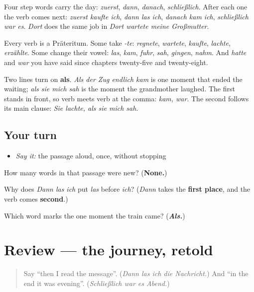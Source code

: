 \begin{culture}
Four step words carry the day: \emph{zuerst}, \emph{dann}, \emph{danach}, \emph{schließlich}. After each one the verb comes next: \emph{zuerst kaufte ich}, \emph{dann las ich}, \emph{danach kam ich}, \emph{schließlich war es}. \emph{Dort} does the same job in \emph{Dort wartete meine Großmutter}.

Every verb is a Präteritum. Some take \emph{-te}: \emph{regnete}, \emph{wartete}, \emph{kaufte}, \emph{lachte}, \emph{erzählte}. Some change their vowel: \emph{las}, \emph{kam}, \emph{fuhr}, \emph{sah}, \emph{gingen}, \emph{nahm}. And \emph{hatte} and \emph{war} you have said since chapters twenty-five and twenty-eight.

Two lines turn on \textbf{als}. \emph{Als der Zug endlich kam} is one moment that ended the waiting; \emph{als sie mich sah} is the moment the grandmother laughed. The first stands in front, so verb meets verb at the comma: \emph{kam, war}. The second follows its main clause: \emph{Sie lachte, als sie mich sah}.
\end{culture}

\subsection*{Your turn}
\begin{itemize}
\raggedright
  \item \emph{Say it:} the passage aloud, once, without stopping
\end{itemize}

\begin{tcolorbox}[breakable,colback=teal!4,colframe=teal!35!black,title={Before you move on}]
How many words in that passage were new? (\textbf{None.})

Why does \emph{Dann las ich} put \emph{las} before \emph{ich}? (\emph{Dann} takes the \textbf{first place}, and the verb comes \textbf{second}.)

Which word marks the one moment the train came? (\emph{\textbf{Als.}})
\end{tcolorbox}
\section[(review)]{Review — the journey, retold}

\label{lesson:GE-C253-review}



\begin{quote}
Say \textquotedblleft{}then I read the message\textquotedblright{}. (\emph{Dann las ich die Nachricht.}) And \textquotedblleft{}in the end it was evening\textquotedblright{}. (\emph{Schließlich war es Abend.})
\end{quote}

